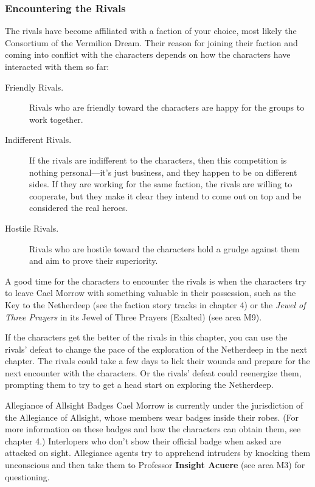 \documentclass[10pt,a4paper,twoside,fancy,bg=print,twocolumn,openany,nodeprecatedcode]{dndbook}
\begin{document}
\subsubsection{Encountering the Rivals}
The rivals have become affiliated with a faction of your choice, most likely the Consortium of the Vermilion Dream. Their reason for joining their faction and coming into conflict with the characters depends on how the characters have interacted with them so far:


\begin{description}
\item[Friendly Rivals.]
Rivals who are friendly toward the characters are happy for the groups to work together.
\item[Indifferent Rivals.]
If the rivals are indifferent to the characters, then this competition is nothing personal—it's just business, and they happen to be on different sides. If they are working for the same faction, the rivals are willing to cooperate, but they make it clear they intend to come out on top and be considered the real heroes.
\item[Hostile Rivals.]
Rivals who are hostile toward the characters hold a grudge against them and aim to prove their superiority.
\end{description}

A good time for the characters to encounter the rivals is when the characters try to leave Cael Morrow with something valuable in their possession, such as the Key to the Netherdeep (see the faction story tracks in chapter 4) or the \textit{Jewel of Three Prayers} in its Jewel of Three Prayers (Exalted) (see area M9).

If the characters get the better of the rivals in this chapter, you can use the rivals' defeat to change the pace of the exploration of the Netherdeep in the next chapter. The rivals could take a few days to lick their wounds and prepare for the next encounter with the characters. Or the rivals' defeat could reenergize them, prompting them to try to get a head start on exploring the Netherdeep.

\begin{DndSidebar}[float=!b]{Allegiance of Allsight Badges}
Cael Morrow is currently under the jurisdiction of the Allegiance of Allsight, whose members wear badges inside their robes. (For more information on these badges and how the characters can obtain them, see chapter 4.) Interlopers who don't show their official badge when asked are attacked on sight. Allegiance agents try to apprehend intruders by knocking them unconscious and then take them to Professor \textbf{Insight Acuere} (see area M3) for questioning.



\end{DndSidebar}
\end{document}
